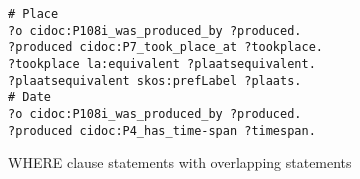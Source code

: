 \begin{listing}[htbp]
    \begin{verbatim}
# Place
?o cidoc:P108i_was_produced_by ?produced.
?produced cidoc:P7_took_place_at ?tookplace.
?tookplace la:equivalent ?plaatsequivalent.
?plaatsequivalent skos:prefLabel ?plaats.
# Date
?o cidoc:P108i_was_produced_by ?produced.
?produced cidoc:P4_has_time-span ?timespan.
    \end{verbatim}
    \caption{WHERE clause statements with overlapping statements}
    \label{lst:where_statements_overlapping}
\end{listing}



